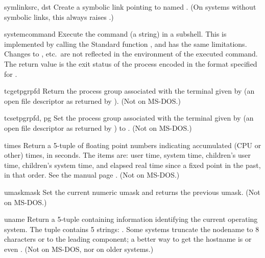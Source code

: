 \begin{funcdesc}{symlink}{src, dst}
Create a symbolic link pointing to  named .  (On
systems without symbolic links, this always raises .)
\end{funcdesc}

\begin{funcdesc}{system}{command}
Execute the command (a string) in a subshell.  This is implemented by
calling the Standard \C{} function , and has the
same limitations.  Changes to , 
etc.\ are not reflected in the environment of the executed command.
The return value is the exit status of the process encoded in the
format specified for .
\end{funcdesc}

\begin{funcdesc}{tcgetpgrp}{fd}
Return the process group associated with the terminal given by
 (an open file descriptor as returned by ).
(Not on MS-DOS.)
\end{funcdesc}

\begin{funcdesc}{tcsetpgrp}{fd, pg}
Set the process group associated with the terminal given by
 (an open file descriptor as returned by )
to .
(Not on MS-DOS.)
\end{funcdesc}

\begin{funcdesc}{times}{}
Return a 5-tuple of floating point numbers indicating accumulated (CPU
or other)
times, in seconds.  The items are: user time, system time, children's
user time, children's system time, and elapsed real time since a fixed
point in the past, in that order.  See the \UNIX{}
manual page .  (Not on MS-DOS.)
\end{funcdesc}

\begin{funcdesc}{umask}{mask}
Set the current numeric umask and returns the previous umask.
(Not on MS-DOS.)
\end{funcdesc}

\begin{funcdesc}{uname}{}
Return a 5-tuple containing information identifying the current
operating system.  The tuple contains 5 strings:
.  Some systems truncate the nodename to 8
characters or to the leading component; a better way to get the
hostname is %
or even
%
.
(Not on MS-DOS, nor on older \UNIX{} systems.)
\end{funcdesc}

